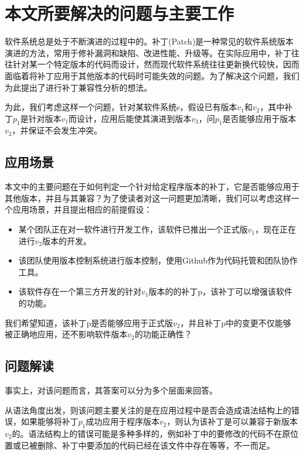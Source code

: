 \section{本文所要解决的问题与主要工作}

软件系统总是处于不断演进的过程中的。补丁(Patch)是一种常见的软件系统版本演进的方法，常用于修补漏洞和缺陷、改进性能、升级等。在实际应用中，补丁往往针对某一个特定版本的代码而设计，然而现代软件系统往往更新换代较快，因而面临着将补丁应用于其他版本的代码时可能失效的问题。为了解决这个问题，我们为此提出了进行补丁兼容性分析的想法。

为此，我们考虑这样一个问题，针对某软件系统s，假设已有版本$v_1$和$v_2$，其中补丁$p_1$是针对版本$v_1$而设计，应用后能使其演进到版本$v_3$，问$p_1$是否能够应用于版本$v_{2}$，并保证不会发生冲突。

\subsection{应用场景}
\label {app}

本文中的主要问题在于如何判定一个针对给定程序版本的补丁，它是否能够应用于其他版本，并且与其兼容？为了使读者对这一问题更加清晰，我们可以考虑这样一个应用场景，并且提出相应的前提假设：

\begin{itemize}
	\item 某个团队正在对一软件进行开发工作，该软件已推出一个正式版$v_{1}$，现在正在进行$v_{2}$版本的开发。
	
	\item 该团队使用版本控制系统进行版本控制，使用Github作为代码托管和团队协作工具。
	
	\item 该软件存在一个第三方开发的针对$v_{1}$版本的的补丁p，该补丁可以增强该软件的功能。
	
\end{itemize}

我们希望知道，该补丁p是否能够应用于正式版$v_{2}$，并且补丁p中的变更不仅能够被正确地应用，还不影响软件版本$v_{2}$的功能正确性？

\subsection{问题解读}

事实上，对该问题而言，其答案可以分为多个层面来回答。

从语法角度出发，则该问题主要关注的是在应用过程中是否会造成语法结构上的错误，如果能够将补丁$p_1$成功应用于程序版本$v_2$，则认为该补丁是可以兼容于新版本$v_2$的。语法结构上的错误可能是多种多样的，例如补丁中的要修改的代码不在原位置或已被删除、补丁中要添加的代码已经在该文件中存在等等，不一而足。

